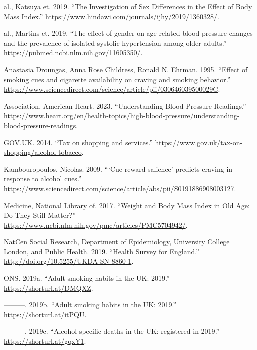 \documentclass[
  11pt,
  twocolumn]{article}
\newlength{\cslhangindent}
\newenvironment{CSLReferences}[2] %
 {\begin{list}{}{%
  \setlength{\itemindent}{0pt}
  \setlength{\leftmargin}{0pt}
  \setlength{\parsep}{0pt}
  \ifodd #1
   \setlength{\leftmargin}{\cslhangindent}
   \setlength{\itemindent}{-1\cslhangindent}
  \fi
  \setlength{\itemsep}{#2\baselineskip}}}
 {\end{list}}
\begin{document}
\label{refs}
\begin{CSLReferences}{1}{0}
al., Katsuya et. 2019. {``{The Investigation of Sex Differences in the
Effect of Body Mass Index}.''}
\url{https://www.hindawi.com/journals/ijhy/2019/1360328/}.

al., Martins et. 2019. {``{The effect of gender on age-related blood
pressure changes and the prevalence of isolated systolic hypertension
among older adults}.''} \url{https://pubmed.ncbi.nlm.nih.gov/11605350/}.

Anastasia Droungas, Anna Rose Childress, Ronald N. Ehrman. 1995.
{``{Effect of smoking cues and cigarette availability on craving and
smoking behavior}.''}
\url{https://www.sciencedirect.com/science/article/pii/030646039500029C}.

Association, American Heart. 2023. {``{Understanding Blood Pressure
Readings}.''}
\url{https://www.heart.org/en/health-topics/high-blood-pressure/understanding-blood-pressure-readings}.

GOV.UK. 2014. {``{Tax on shopping and services}.''}
\url{https://www.gov.uk/tax-on-shopping/alcohol-tobacco}.

Kambouropoulos, Nicolas. 2009. {``{{`Cue reward salience'} predicts
craving in response to alcohol cues}.''}
\url{https://www.sciencedirect.com/science/article/abs/pii/S0191886908003127}.

Medicine, National Library of. 2017. {``{Weight and Body Mass Index in
Old Age: Do They Still Matter?}''}
\url{https://www.ncbi.nlm.nih.gov/pmc/articles/PMC5704942/}.

NatCen Social Research, Department of Epidemiology, University College
London, and Public Health. 2019. {``{Health Survey for England}.''}
\url{http://doi.org/10.5255/UKDA-SN-8860-1}.

ONS. 2019a. {``{Adult smoking habits in the UK: 2019}.''}
\url{https://shorturl.at/DMQXZ}.

---------. 2019b. {``{Adult smoking habits in the UK: 2019}.''}
\url{https://shorturl.at/itPQU}.

---------. 2019c. {``{Alcohol-specific deaths in the UK: registered in
2019}.''} \url{https://shorturl.at/gqxY1}.


\end{CSLReferences}
\end{document}
